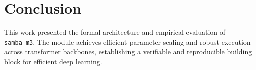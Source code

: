 \section{Conclusion}
This work presented the formal architecture and empirical evaluation of \texttt{samba_m3}. The module achieves efficient parameter scaling and robust execution across transformer backbones, establishing a verifiable and reproducible building block for efficient deep learning.
